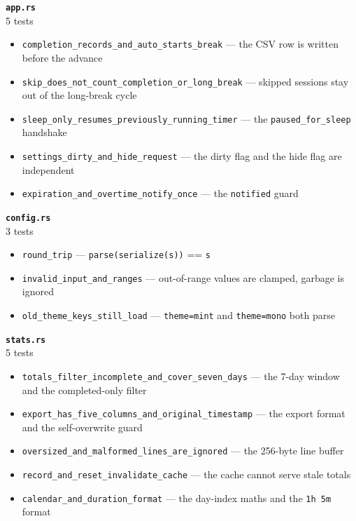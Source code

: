 \noindent\textbf{\textcolor{pastel!45!black}{\texttt{app.rs}}}\\[0.4em]
\hspace{1.4em}5 tests\par
\begin{itemize}[leftmargin=1.4em,itemsep=0.15em,topsep=0.1em]
\item \texttt{completion\_records\_\allowbreak and\_auto\_starts\_break} --- the CSV row is written before the advance
\item \texttt{skip\_does\_not\_\allowbreak count\_completion\_or\_long\_break} --- skipped sessions stay out of the long-break cycle
\item \texttt{sleep\_only\_\allowbreak resumes\_previously\_running\_timer} --- the \texttt{paused\_for\_sleep} handshake
\item \texttt{settings\_dirty\_\allowbreak and\_hide\_request} --- the dirty flag and the hide flag are independent
\item \texttt{expiration\_and\_\allowbreak overtime\_notify\_once} --- the \texttt{notified} guard
\end{itemize}

\noindent\textbf{\textcolor{pastel!45!black}{\texttt{config.rs}}}\\[0.4em]
\hspace{1.4em}3 tests\par
\begin{itemize}[leftmargin=1.4em,itemsep=0.15em,topsep=0.1em]
\item \texttt{round\_trip} --- \texttt{parse(serialize(s))} == \texttt{s}
\item \texttt{invalid\_input\_\allowbreak and\_ranges} --- out-of-range values are clamped, garbage is ignored
\item \texttt{old\_theme\_keys\_\allowbreak still\_load} --- \texttt{theme=mint} and \texttt{theme=mono} both parse
\end{itemize}

\noindent\textbf{\textcolor{pastel!45!black}{\texttt{stats.rs}}}\\[0.4em]
\hspace{1.4em}5 tests\par
\begin{itemize}[leftmargin=1.4em,itemsep=0.15em,topsep=0.1em]
\item \texttt{totals\_filter\_\allowbreak incomplete\_and\_cover\_seven\_days} --- the 7-day window and the completed-only filter
\item \texttt{export\_has\_\allowbreak five\_columns\_and\_original\_timestamp} --- the export format and the self-overwrite guard
\item \texttt{oversized\_and\_\allowbreak malformed\_lines\_are\_ignored} --- the 256-byte line buffer
\item \texttt{record\_and\_\allowbreak reset\_invalidate\_cache} --- the cache cannot serve stale totals
\item \texttt{calendar\_and\_\allowbreak duration\_format} --- the day-index maths and the \texttt{1h 5m} format
\end{itemize}

